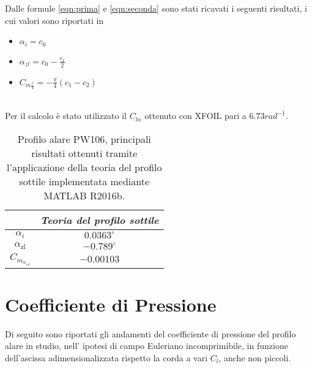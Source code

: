 \noindent \\ \\
Dalle formule \ref{eqn:prima} e \ref{eqn:seconda} sono stati ricavati i seguenti risultati, i cui valori sono riportati in 


\begin {itemize}
\item ${\alpha}_i=c_0$
\item ${\alpha}_{zl}=c_0-\frac {c_1}{2}$
\item $C_{m\frac {c}{4}}=-\frac {{\pi}}{4}(c_1-c_2)$
\end{itemize}

\noindent \\ 
Per il calcolo è stato utilizzato il $C_{l{\alpha}}$ ottenuto con XFOIL pari a $6.73 rad^{-1}$.


%


\renewcommand\arraystretch{1.4} 
\begin{table} [!h]\centering {}
\begin{tabular}{c| c}
\toprule
  &  \emph{Teoria del profilo sottile} \\ 
\midrule
${\alpha}_{i} $ & $0.0363^\circ$ \\
${\alpha}_{\mathrm{zl}}$ & $-0.789^\circ$ \\
${ C_{m_{{\alpha}_{c4}}}}$ &$-0.00103$  \\ 
\bottomrule
\end{tabular}
\caption {Profilo alare PW106, principali risultati ottenuti tramite l'applicazione della teoria del profilo sottile implementata mediante MATLAB R2016b.}
\label{tab:profiloSottile}
\end{table}

\section{Coefficiente di Pressione}

Di seguito sono riportati gli andamenti del coefficiente di pressione del profilo alare in studio, nell’ ipotesi di campo Euleriano incomprimibile, in funzione dell’ascissa adimensionalizzata rispetto la corda a vari $C_l$, anche non piccoli.\\ \\


